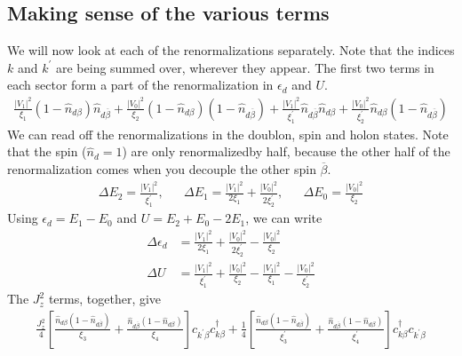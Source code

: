 \documentclass[twoside]{report}
\numberwithin{equation}{section}
\begin{document}
\subsection{Making sense of the various terms}
We will now look at each of the renormalizations separately. Note that the indices \(k\) and \(k^\prime\) are being summed over, wherever they appear. The first two terms in each sector form a part of the renormalization in \(\epsilon_d\) and \(U\).
\begin{equation}\begin{aligned}
\frac{|V_1|^2}{\xi_1}\left( 1 - \hat n_{d\beta} \right) \hat n_{d\overline\beta} + \frac{|V_0|^2}{\xi_2}\left( 1 - \hat n_{d\beta} \right) \left( 1 - \hat n_{d\overline\beta} \right) + \frac{|V_1|^2}{\xi^\prime_1}\hat n_{d\overline\beta}\hat n_{d\beta} + \frac{|V_0|^2}{\xi^\prime_2}\hat n_{d\beta}\left(1 - \hat n_{d\overline\beta}\right)
\end{aligned}\end{equation}
We can read off the renormalizations in the doublon, spin and holon states. Note that the spin (\(\hat n_{d}=1\)) are only renormalizedby half, because the other half of the renormalization comes when you decouple the other spin \(\overline\beta\).
\begin{equation}\begin{aligned}
	\Delta E_2 = \frac{|V_1|^2}{\xi^\prime_1}, && \Delta E_1 =\frac{|V_1|^2}{2\xi_1} + \frac{|V_0|^2}{2\xi_2^\prime}, && \Delta E_0 = \frac{|V_0|^2}{\xi_2}
\end{aligned}\end{equation}
Using \(\epsilon_d = E_1 - E_0\) and \(U = E_2 + E_0 - 2E_1\), we can write
\begin{equation}\begin{aligned}
	\label{edU}
	\Delta \epsilon_d &= \frac{|V_1|^2}{2\xi_1} + \frac{|V_0|^2}{2\xi_2^\prime} - \frac{|V_0|^2}{\xi_2}\\
	\Delta U &= \frac{|V_1|^2}{\xi_1^\prime} + \frac{|V_0|^2}{\xi_2} - \frac{|V_1|^2}{\xi_1} - \frac{|V_0|^2}{\xi_2^\prime}
\end{aligned}\end{equation}
The \(J_z^2\) terms, together, give
\begin{equation}\begin{aligned}
\frac{J_z^2}{4}\left[\frac{\hat n_{d\beta}\left( 1 - \hat n_{d\overline\beta} \right) }{\xi_3} + \frac{\hat n_{d\overline\beta}\left( 1 - \hat n_{d\beta} \right)}{\xi_4} \right]c_{k^\prime\beta}c^\dagger_{k\beta} +\frac{1}{4}\left[ \frac{\hat n_{d\beta}\left( 1 - \hat n_{d\overline\beta} \right) }{\xi^\prime_3} + \frac{\hat n_{d\overline\beta}\left( 1 - \hat n_{d\beta} \right)}{\xi^\prime_4} \right]c^\dagger_{k\beta}c_{k^\prime\beta}
\end{aligned}\end{equation}
\end{document}
